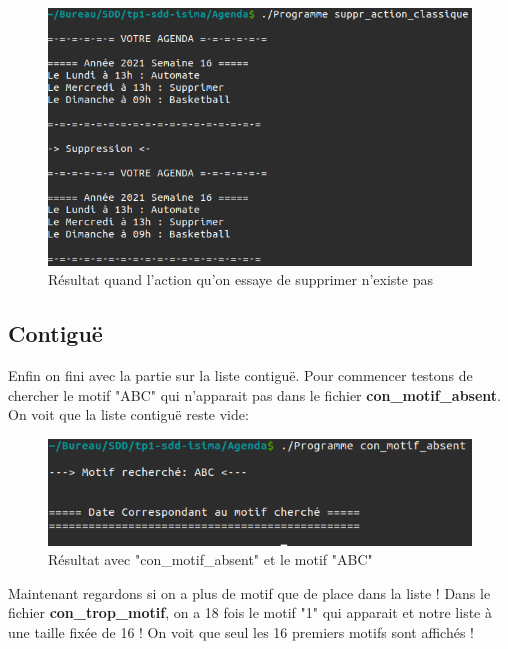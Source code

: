 \documentclass[12pt,french]{article} %
\begin{document}
\begin{figure}[H]
	\includegraphics[scale=0.6]{su-ep.png}
	\centering
	\caption{Résultat quand l'action qu'on essaye de supprimer n'existe pas}
\end{figure}

\subsection{Contiguë}

Enfin on fini avec la partie sur la liste contiguë. Pour commencer testons de chercher le motif "ABC" qui n'apparait pas dans le fichier \textbf{con\_motif\_absent}. On voit que la liste contiguë reste vide:\newline

\begin{figure}[H]
	\includegraphics[scale=0.6]{co-ep.png}
	\centering
	\caption{Résultat avec "con\_motif\_absent" et le motif "ABC"}
\end{figure}


Maintenant regardons si on a plus de motif que de place dans la liste ! Dans le fichier \textbf{con\_trop\_motif}, on a 18 fois le motif "1" qui apparait et notre liste à une taille fixée de 16 ! On voit que seul les 16 premiers motifs sont affichés !\newline
\end{document}
